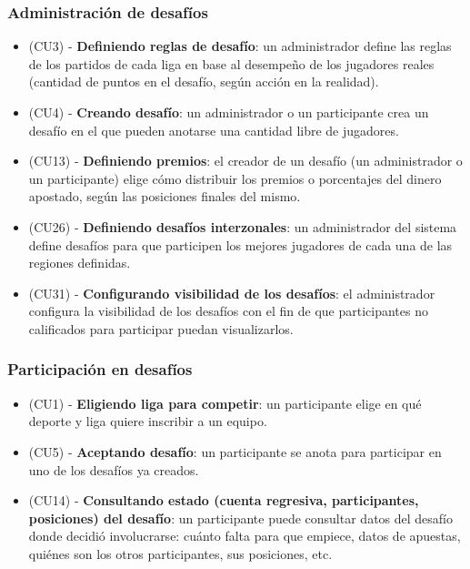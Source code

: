 \subsubsection{Administración de desafíos}
\begin{itemize}
\item (CU3) - \textbf{Definiendo reglas de desafío}: un administrador define las reglas de los partidos de cada liga en base al desempeño de los jugadores reales (cantidad de puntos en el desafío, según acción en la realidad).
\item (CU4) - \textbf{Creando desafío}: un administrador o un participante crea un desafío en el que pueden anotarse una cantidad libre de jugadores.
\item (CU13) - \textbf{Definiendo premios}: el creador de un desafío (un administrador o un participante) elige cómo distribuir los premios o porcentajes del dinero apostado, según las posiciones finales del mismo.
\item (CU26) - \textbf{Definiendo desafíos interzonales}: un administrador del sistema define desafíos para que participen los mejores jugadores de cada una de las regiones definidas.
\item (CU31) - \textbf{Configurando visibilidad de los desafíos}: el administrador configura la visibilidad de los desafíos con el fin de que participantes no calificados para participar puedan visualizarlos.
\end{itemize}

\subsubsection{Participación en desafíos}

\begin{itemize}
\item (CU1) - \textbf{Eligiendo liga para competir}: un participante elige en qué deporte y liga quiere inscribir a un equipo.
\item (CU5) - \textbf{Aceptando desafío}: un participante se anota para participar en uno de los desafíos ya creados.
\item (CU14) - \textbf{Consultando estado (cuenta regresiva, participantes, posiciones) del desafío}: un participante puede consultar datos del desafío donde decidió involucrarse: cuánto falta para que empiece, datos de apuestas, quiénes son los otros participantes, sus posiciones, etc.
\end{itemize}



